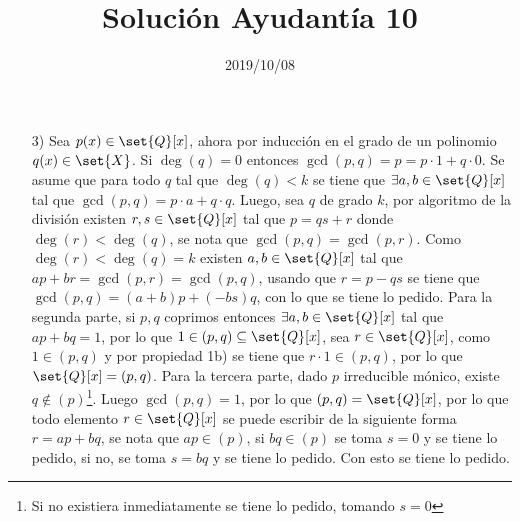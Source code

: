 \documentclass{ayudantia}
\title{Solución Ayudantía 10}
\date{2019/10/08}
\begin{document}
\maketitle
\begin{itemize}
    \item[3)] Sea \(p(x)\in\set{Q}[x]\), ahora por inducción en el grado de un polinomio \(q(x)\in\set{X}\). Si \(\deg(q)=0\) entonces \(\gcd(p,q)=p=p\cdot 1+q\cdot 0\). Se asume que para todo \(q\) tal que \(\deg(q)<k\) se tiene que \(\exists a,b\in\set{Q}[x]\) tal que \(\gcd(p,q)=p\cdot a+q\cdot q\). Luego, sea \(q\) de grado \(k\), por algoritmo de la división existen \(r,s\in\set{Q}[x]\) tal que \(p=qs+r\) donde \(\deg(r)<\deg(q)\), se nota que \(\gcd(p,q)=\gcd(p,r)\). Como \(\deg(r)<\deg(q)=k\) existen \(a,b\in\set{Q}[x]\) tal que \(ap+br=\gcd(p,r)=\gcd(p,q)\), usando que \(r=p-qs\) se tiene que \(\gcd(p,q)=(a+b)p+(-bs)q\), con lo que se tiene lo pedido.
    Para la segunda parte, si \(p,q\) coprimos entonces \(\exists a,b\in\set{Q}[x]\) tal que \(ap+bq=1\), por lo que \(1\in(p,q)\subseteq\set{Q}[x]\), sea \(r\in\set{Q}[x]\), como \(1\in(p,q)\) y por propiedad 1b) se tiene que \(r\cdot 1\in (p,q)\), por lo que \(\set{Q}[x]=(p,q)\).
    Para la tercera parte, dado \(p\) irreducible mónico, existe \(q\notin(p)\)\footnote{Si no existiera inmediatamente se tiene lo pedido, tomando \(s=0\)}. Luego \(\gcd(p,q)=1\), por lo que \((p,q)=\set{Q}[x]\), por lo que todo elemento \(r\in\set{Q}[x]\) se puede escribir de la siguiente forma \(r=ap+bq\), se nota que \(ap\in(p)\), si \(bq\in(p)\) se toma \(s=0\) y se tiene lo pedido, si no, se toma \(s=bq\) y se tiene lo pedido. Con esto se tiene lo pedido.
\end{itemize}
\end{document}

